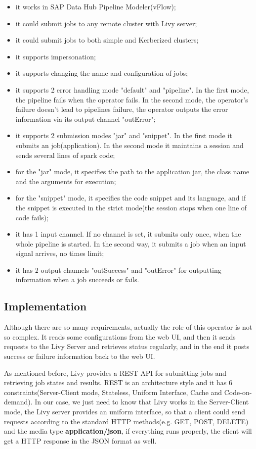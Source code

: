 \documentclass[article,colorback,accentcolor=tud4c]{tudreport}
\begin{document}
	\begin{itemize}
		\item it works in SAP Data Hub Pipeline Modeler(vFlow);
		\item it could submit jobs to any remote cluster with Livy server;
		\item it could submit jobs to both simple and Kerberized clusters;
		\item it supports impersonation;
		\item it supports changing the name and configuration of jobs;
		\item it supports 2 error handling mode "default" and "pipeline". In the first mode, the pipeline fails when the operator fails. In the second mode, the operator's failure doesn't lead to pipelines failure, the operator outputs the error information via its output channel "outError";
		\item it supports 2 submission modes "jar" and "snippet". In the first mode it submits an job(application). In the second mode it maintains a session and sends several lines of spark code;
		\item for the "jar" mode, it specifies the path to the application jar, the class name and the arguments for execution;
		\item for the "snippet" mode, it specifies the code snippet and its language, and if the snippet is executed in the strict mode(the session stops when one line of code fails);
		\item it has 1 input channel. If no channel is set, it submits only once, when the whole pipeline is started. In the second way, it submits a job when an input signal arrives, no times limit;
		\item it has 2 output channels "outSuccess" and "outError" for outputting information when a job succeeds or fails.
	\end{itemize}
	
	\subsection{Implementation}
	
	Although there are so many requirements, actually the role of this operator is not so complex. It reads some configurations from the web UI, and then it sends requests to the Livy Server and retrieves status regularly, and in the end it posts success or failure information back to the web UI.
	
	As mentioned before, Livy provides a REST API for submitting jobs and retrieving job states and results. REST is an architecture style and it has 6 constraints(Server-Client mode, Stateless, Uniform Interface, Cache and Code-on-demand). In our case, we just need to know that Livy works in the Server-Client mode, the Livy server provides an uniform interface, so that a client could send requests according to the standard HTTP methods(e.g. GET, POST, DELETE) and the media type \textbf{application/json}, if everything runs properly, the client will get a HTTP response in the JSON format as well.
	
\end{document}
